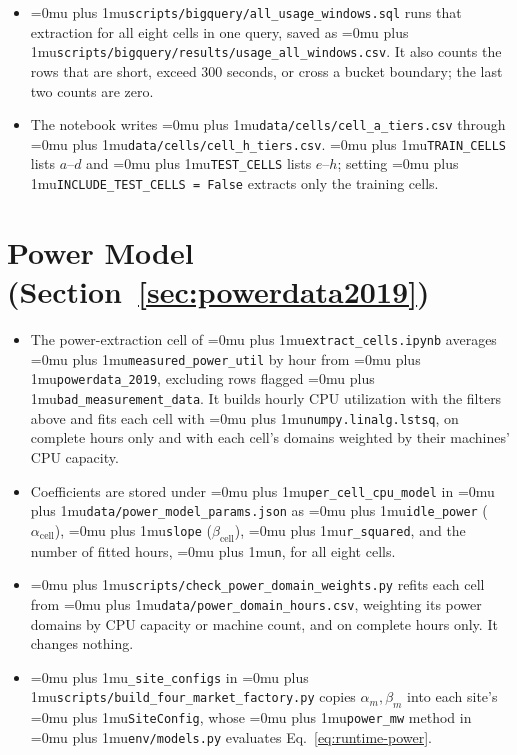 \documentclass{UNCC-thesis}
\newcommand{\codepath}[1]{{\Urlmuskip=0mu plus 1mu\relax\nolinkurl{#1}}}
\begin{document}
\begin{itemize}
        usage rows with no matching priority, and those count as service.
  \item \codepath{scripts/bigquery/all_usage_windows.sql} runs that extraction for
        all eight cells in one query, saved as
        \codepath{scripts/bigquery/results/usage_all_windows.csv}. It also counts the
        rows that are short, exceed 300 seconds, or cross a bucket boundary; the last
        two counts are zero.
  \item The notebook writes \codepath{data/cells/cell_a_tiers.csv} through
        \codepath{data/cells/cell_h_tiers.csv}. \codepath{TRAIN_CELLS} lists
        \(a\)--\(d\) and \codepath{TEST_CELLS} lists \(e\)--\(h\); setting
        \codepath{INCLUDE_TEST_CELLS = False} extracts only the training
        cells.
\end{itemize}

\section{Power Model (Section~\ref{sec:powerdata2019})}
\begin{itemize}
  \item The power-extraction cell of
        \codepath{extract_cells.ipynb} averages
        \codepath{measured_power_util} by hour from \codepath{powerdata_2019},
        excluding rows flagged \codepath{bad_measurement_data}. It builds hourly
        CPU utilization with the filters above and fits each cell with
        \codepath{numpy.linalg.lstsq}, on complete hours only and with each
        cell's domains weighted by their machines' CPU capacity.
  \item Coefficients are stored under \codepath{per_cell_cpu_model} in
        \codepath{data/power_model_params.json} as \codepath{idle_power}
        (\(\alpha_{\mathrm{cell}}\)), \codepath{slope} (\(\beta_{\mathrm{cell}}\)), \codepath{r_squared},
        and the number of fitted hours, \codepath{n}, for all eight cells.
  \item \codepath{scripts/check_power_domain_weights.py} refits each cell from
        \codepath{data/power_domain_hours.csv}, weighting its power domains by CPU
        capacity or machine count, and on complete hours only. It changes nothing.
  \item \codepath{_site_configs} in
        \codepath{scripts/build_four_market_factory.py} copies
        \(\alpha_m,\beta_m\) into each site's \codepath{SiteConfig}, whose
        \codepath{power_mw} method in \codepath{env/models.py}
        evaluates Eq.~\eqref{eq:runtime-power}.
\end{itemize}
\end{document}
